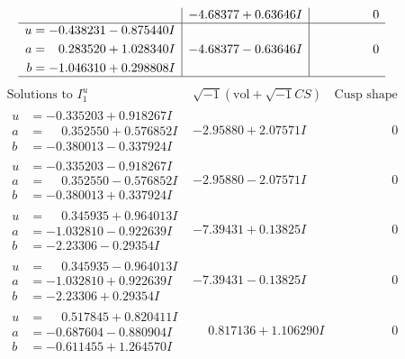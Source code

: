 \documentclass[1p]{elsarticle_modified}
\theoremstyle{definition}
\newcommand{\I}{\sqrt{-1}}
\begin{document}
$$\begin{array}{c|c|c}
 & -4.68377 + 0.63646 I & \phantom{-0.000000 } 0 \\ \hline\begin{aligned}
u &= -0.438231 - 0.875440 I \\
a &= \phantom{-}0.283520 + 1.028340 I \\
b &= -1.046310 + 0.298808 I\end{aligned}
 & -4.68377 - 0.63646 I & \phantom{-0.000000 } 0\\
 \hline 
 \end{array}$$\newpage$$\begin{array}{c|c|c}  
\text{Solutions to }I^u_{1}& \I (\text{vol} + \sqrt{-1}CS) & \text{Cusp shape}\\
 \hline 
\begin{aligned}
u &= -0.335203 + 0.918267 I \\
a &= \phantom{-}0.352550 + 0.576852 I \\
b &= -0.380013 - 0.337924 I\end{aligned}
 & -2.95880 + 2.07571 I & \phantom{-0.000000 } 0 \\ \hline\begin{aligned}
u &= -0.335203 - 0.918267 I \\
a &= \phantom{-}0.352550 - 0.576852 I \\
b &= -0.380013 + 0.337924 I\end{aligned}
 & -2.95880 - 2.07571 I & \phantom{-0.000000 } 0 \\ \hline\begin{aligned}
u &= \phantom{-}0.345935 + 0.964013 I \\
a &= -1.032810 - 0.922639 I \\
b &= -2.23306 - 0.29354 I\end{aligned}
 & -7.39431 + 0.13825 I & \phantom{-0.000000 } 0 \\ \hline\begin{aligned}
u &= \phantom{-}0.345935 - 0.964013 I \\
a &= -1.032810 + 0.922639 I \\
b &= -2.23306 + 0.29354 I\end{aligned}
 & -7.39431 - 0.13825 I & \phantom{-0.000000 } 0 \\ \hline\begin{aligned}
u &= \phantom{-}0.517845 + 0.820411 I \\
a &= -0.687604 - 0.880904 I \\
b &= -0.611455 + 1.264570 I\end{aligned}
 & \phantom{-}0.817136 + 1.106290 I & \phantom{-0.000000 } 0 \\ \hline\begin{aligned}

\end{aligned}
\end{array}$$
\end{document}

